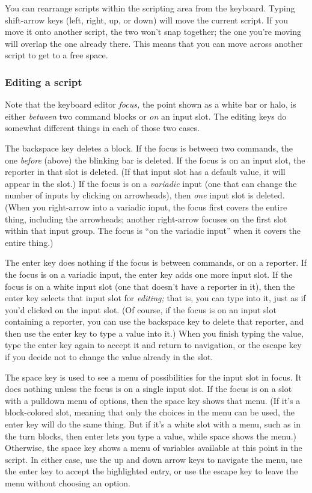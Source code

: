 You can rearrange scripts within the scripting area from the keyboard.
Typing shift-arrow keys (left, right, up, or down) will move the current
script. If you move it onto another script, the two won't snap together;
the one you're moving will overlap the one already there. This means
that you can move across another script to get to a free space.

\subsubsection{Editing a script}\label{editing-a-script}

Note that the keyboard editor \emph{focus,} the point shown as a white
bar or halo, is either \emph{between} two command blocks or \emph{on} an
input slot. The editing keys do somewhat different things in each of
those two cases.

The backspace key deletes a block. If the focus is between two commands,
the one \emph{before} (above) the blinking bar is deleted. If the focus
is on an input slot, the reporter in that slot is deleted. (If that
input slot has a default value, it will appear in the slot.) If the
focus is on a \emph{variadic} input (one that can change the number of
inputs by clicking on arrowheads), then \emph{one} input slot is
deleted. (When you right-arrow into a variadic input, the focus first
covers the entire thing, including the arrowheads; another right-arrow
focuses on the first slot within that input group. The focus is ``on the
variadic input'' when it covers the entire thing.)

The enter key does nothing if the focus is between commands, or on a
reporter. If the focus is on a variadic input, the enter key adds one
more input slot. If the focus is on a white input slot (one that doesn't
have a reporter in it), then the enter key selects that input slot for
\emph{editing;} that is, you can type into it, just as if you'd clicked
on the input slot. (Of course, if the focus is on an input slot
containing a reporter, you can use the backspace key to delete that
reporter, and then use the enter key to type a value into it.) When you
finish typing the value, type the enter key again to accept it and
return to navigation, or the escape key if you decide not to change the
value already in the slot.

The space key is used to see a menu of possibilities for the input slot
in focus. It does nothing unless the focus is on a single input slot. If
the focus is on a slot with a pulldown menu of options, then the space
key shows that menu. (If it's a block-colored slot, meaning that only
the choices in the menu can be used, the enter key will do the same
thing. But if it's a white slot with a menu, such as in the turn blocks,
then enter lets you type a value, while space shows the menu.)
Otherwise, the space key shows a menu of variables available at this
point in the script. In either case, use the up and down arrow keys to
navigate the menu, use the enter key to accept the highlighted entry, or
use the escape key to leave the menu without choosing an option.


